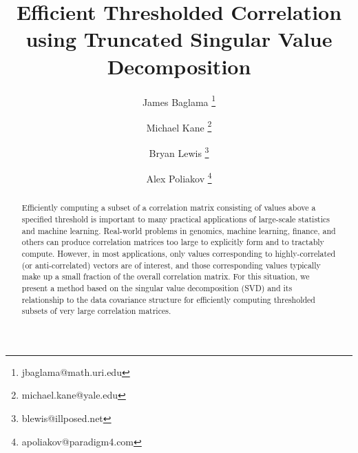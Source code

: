 \documentclass{article}
\title{Efficient Thresholded Correlation using Truncated Singular Value Decomposition}
\author[1]{James Baglama \thanks{jbaglama@math.uri.edu}}
\author[2]{Michael Kane \thanks{michael.kane@yale.edu}}
\author[3]{Bryan Lewis \thanks{blewis@illposed.net}}
\author[3]{Alex Poliakov \thanks{apoliakov@paradigm4.com}}
\affil[1]{
University of Rhode Island
}
\affil[2]{
Yale University
}
\affil[3]{
Paradigm4, Inc.
}
\let\proglang=\textsf
\numberwithin{algorithmctr}{section}
\begin{document}

\maketitle
\begin{abstract}
Efficiently computing a subset of a correlation matrix consisting of values above 
a specified threshold is important to many practical applications of large-scale 
statistics and machine learning. Real-world problems in genomics, machine 
learning, finance, and others can produce correlation matrices too large to 
explicitly form and to tractably compute. However, in most applications, only 
values corresponding to highly-correlated (or anti-correlated) vectors are of 
interest, and those corresponding values typically make up a small fraction of 
the overall correlation matrix. For this situation, we present a method based on 
the singular value decomposition (SVD) and its relationship to the data 
covariance structure for efficiently computing thresholded subsets of very large correlation matrices.
\end{abstract}
\end{document}
